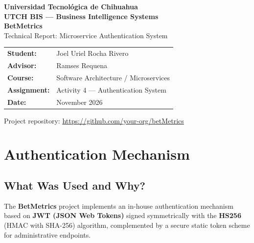 \documentclass[11pt,a4paper]{article}
\begin{document}
\begin{titlepage}
    \centering
    \vspace*{2cm}
    {\Huge \textbf{Universidad Tecnol\'ogica de Chihuahua}}\\[0.4cm]
    {\Large \textbf{UTCH BIS --- Business Intelligence Systems}}\\[2cm]
    
    {\Huge \textbf{BetMetrics}}\\[0.5cm]
    {\Large Technical Report: Microservice Authentication System}\\[2cm]
    
    \begin{tabular}{ll}
        \textbf{Student:}    & Joel Uriel Rocha Rivero \\[0.3cm]
        \textbf{Advisor:}    & Ramses Requena \\[0.3cm]
        \textbf{Course:}     & Software Architecture / Microservices \\[0.3cm]
        \textbf{Assignment:} & Activity 4 --- Authentication System \\[0.3cm]
        \textbf{Date:}       & November 2026
    \end{tabular}
    
    \vfill
    {\small Project repository: \url{https://github.com/your-org/betMetrics}}
\end{titlepage}

\tableofcontents
\newpage

\section{Authentication Mechanism}

\subsection{What Was Used and Why?}
The \textbf{BetMetrics} project implements an in-house authentication mechanism based on \textbf{JWT (JSON Web Tokens)} signed symmetrically with the \textbf{HS256} (HMAC with SHA-256) algorithm, complemented by a secure static token scheme for administrative endpoints.
\end{document}
